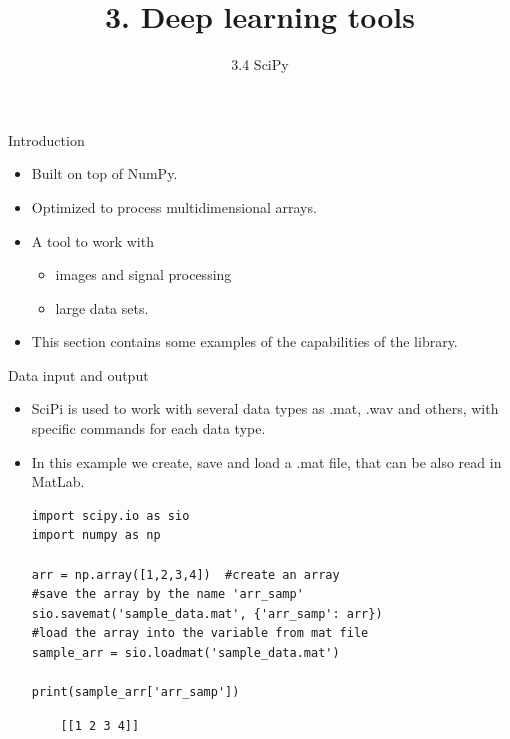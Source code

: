 \documentclass{beamer}
\title{3. Deep learning tools}
\subtitle{3.4 SciPy}
\begin{document}
\maketitle

\begin{frame}{Introduction}
\begin{itemize}
    \item Built on top of NumPy.
    \item Optimized to process multidimensional arrays.
    \item A tool to work with
    \begin{itemize}
        \item images and signal processing
        \item large data sets. 
    \end{itemize}
    \item This section contains some examples of the capabilities of the library.  
\end{itemize}
\end{frame}

\begin{frame}[fragile]{Data input and output}
    \begin{itemize}
        \item SciPi is used to work with several data types as .mat, .wav and others, with specific commands for each data type. 
        \item In this example we create, save and load a .mat file, that can be also read in MatLab. 
\begin{lstlisting}
import scipy.io as sio
import numpy as np

arr = np.array([1,2,3,4])  #create an array 
#save the array by the name 'arr_samp'
sio.savemat('sample_data.mat', {'arr_samp': arr}) 
#load the array into the variable from mat file
sample_arr = sio.loadmat('sample_data.mat') 

print(sample_arr['arr_samp'])
\end{lstlisting}
\begin{tiny}
\begin{verbatim}
    [[1 2 3 4]]
\end{verbatim}
\end{tiny}
\end{itemize}
\end{frame}
\end{document}
